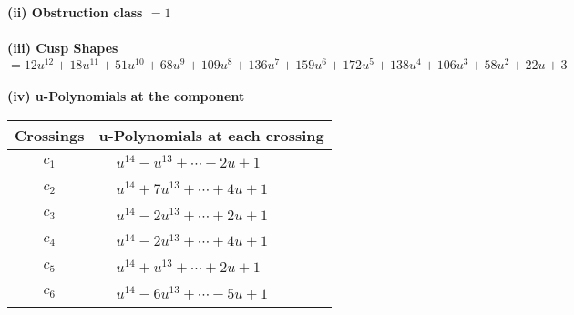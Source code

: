 \documentclass[1p]{elsarticle_modified}
\theoremstyle{definition}
\begin{document}
\flushleft \textbf{(ii) Obstruction class $= 1$}\\~\\
\flushleft \textbf{(iii) Cusp Shapes $= 12 u^{12}+18 u^{11}+51 u^{10}+68 u^9+109 u^8+136 u^7+159 u^6+172 u^5+138 u^4+106 u^3+58 u^2+22 u+3$}\\~\\
\newpage\renewcommand{\arraystretch}{1}
\flushleft \textbf{(iv) u-Polynomials at the component}\newline \\
\begin{tabular}{m{50pt}|m{274pt}}
Crossings & \hspace{64pt}u-Polynomials at each crossing \\
\hline $$\begin{aligned}c_{1}\end{aligned}$$&$\begin{aligned}
&u^{14}- u^{13}+\cdots-2 u+1
\end{aligned}$\\
\hline $$\begin{aligned}c_{2}\end{aligned}$$&$\begin{aligned}
&u^{14}+7 u^{13}+\cdots+4 u+1
\end{aligned}$\\
\hline $$\begin{aligned}c_{3}\end{aligned}$$&$\begin{aligned}
&u^{14}-2 u^{13}+\cdots+2 u+1
\end{aligned}$\\
\hline $$\begin{aligned}c_{4}\end{aligned}$$&$\begin{aligned}
&u^{14}-2 u^{13}+\cdots+4 u+1
\end{aligned}$\\
\hline $$\begin{aligned}c_{5}\end{aligned}$$&$\begin{aligned}
&u^{14}+u^{13}+\cdots+2 u+1
\end{aligned}$\\
\hline $$\begin{aligned}c_{6}\end{aligned}$$&$\begin{aligned}
&u^{14}-6 u^{13}+\cdots-5 u+1
\end{aligned}$\\

\end{tabular}
\end{document}
